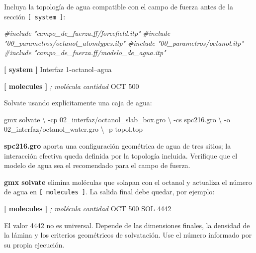 \documentclass[
  spanish,
  11pt,
  a4paper]{article}
\newenvironment{Shaded}{\begin{snugshade}}{\end{snugshade}}
\newcommand{\AttributeTok}[1]{\textcolor[rgb]{0.13,0.29,0.53}{#1}}
\newcommand{\CommentTok}[1]{\textcolor[rgb]{0.56,0.35,0.01}{\textit{#1}}}
\newcommand{\DataTypeTok}[1]{\textcolor[rgb]{0.13,0.29,0.53}{#1}}
\newcommand{\ExtensionTok}[1]{#1}
\newcommand{\KeywordTok}[1]{\textcolor[rgb]{0.13,0.29,0.53}{\textbf{#1}}}
\newcommand{\NormalTok}[1]{#1}
\begin{document}
Incluya la topología de agua compatible con el campo de fuerza antes de
la sección \texttt{{[}\ system\ {]}}:

\begin{Shaded}
\begin{Highlighting}[]
\CommentTok{\#include "campo\_de\_fuerza.ff/forcefield.itp"}
\CommentTok{\#include "00\_parametros/octanol\_atomtypes.itp"}
\CommentTok{\#include "00\_parametros/octanol.itp"}
\CommentTok{\#include "campo\_de\_fuerza.ff/modelo\_de\_agua.itp"}

\KeywordTok{[ system ]}
\DataTypeTok{Interfaz 1{-}octanol–agua}

\KeywordTok{[ molecules ]}
\CommentTok{; molécula    cantidad}
\DataTypeTok{OCT           500}
\end{Highlighting}
\end{Shaded}

Solvate usando explícitamente una caja de agua:

\begin{Shaded}
\begin{Highlighting}[]
\ExtensionTok{gmx}\NormalTok{ solvate }\DataTypeTok{\textbackslash{}}
    \AttributeTok{{-}cp}\NormalTok{ 02\_interfaz/octanol\_slab\_box.gro }\DataTypeTok{\textbackslash{}}
    \AttributeTok{{-}cs}\NormalTok{ spc216.gro }\DataTypeTok{\textbackslash{}}
    \AttributeTok{{-}o}\NormalTok{ 02\_interfaz/octanol\_water.gro }\DataTypeTok{\textbackslash{}}
    \AttributeTok{{-}p}\NormalTok{ topol.top}
\end{Highlighting}
\end{Shaded}

\textbf{spc216.gro} aporta una configuración geométrica de agua de tres
sitios; la interacción efectiva queda definida por la topología
incluida. Verifique que el modelo de agua sea el recomendado para el
campo de fuerza.

\textbf{gmx solvate} elimina moléculas que solapan con el octanol y
actualiza el número de agua en \texttt{{[}\ molecules\ {]}}. La salida
final debe quedar, por ejemplo:

\begin{Shaded}
\begin{Highlighting}[]
\KeywordTok{[ molecules ]}
\CommentTok{; molécula    cantidad}
\DataTypeTok{OCT           500}
\DataTypeTok{SOL           4442}
\end{Highlighting}
\end{Shaded}

El valor 4442 no es universal. Depende de las dimensiones finales, la
densidad de la lámina y los criterios geométricos de solvatación. Use el
número informado por su propia ejecución.
\end{document}
